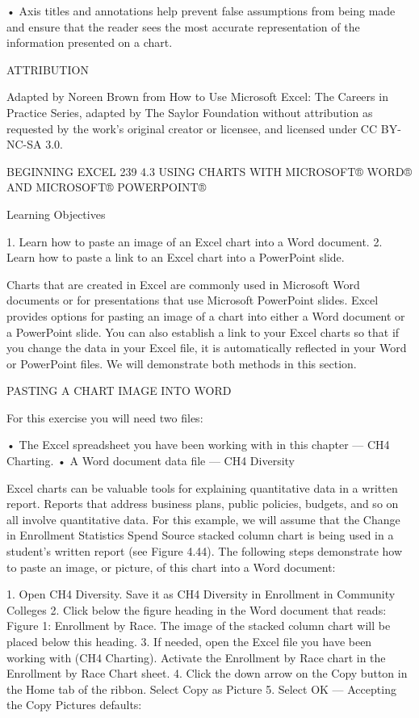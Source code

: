 • Axis titles and annotations help prevent false assumptions from being made and ensure that the reader sees
the most accurate representation of the information presented on a chart.



ATTRIBUTION

Adapted by Noreen Brown from How to Use Microsoft Excel: The Careers in Practice Series, adapted
by The Saylor Foundation without attribution as requested by the work’s original creator or
licensee, and licensed under CC BY-NC-SA 3.0.




BEGINNING EXCEL 239
4.3 USING CHARTS WITH MICROSOFT® WORD® AND MICROSOFT®
POWERPOINT®




Learning Objectives


1. Learn how to paste an image of an Excel chart into a Word document.
2. Learn how to paste a link to an Excel chart into a PowerPoint slide.



Charts that are created in Excel are commonly used in Microsoft Word documents or for
presentations that use Microsoft PowerPoint slides. Excel provides options for pasting an image of a
chart into either a Word document or a PowerPoint slide. You can also establish a link to your Excel
charts so that if you change the data in your Excel file, it is automatically reflected in your Word or
PowerPoint files. We will demonstrate both methods in this section.

PASTING A CHART IMAGE INTO WORD

For this exercise you will need two files:

• The Excel spreadsheet you have been working with in this chapter — CH4 Charting.
• A Word document data file — CH4 Diversity

Excel charts can be valuable tools for explaining quantitative data in a written report. Reports that
address business plans, public policies, budgets, and so on all involve quantitative data. For this
example, we will assume that the Change in Enrollment Statistics Spend Source stacked column chart
is being used in a student’s written report (see Figure 4.44). The following steps demonstrate how to
paste an image, or picture, of this chart into a Word document:

1. Open CH4 Diversity. Save it as CH4 Diversity in Enrollment in Community Colleges
2. Click below the figure heading in the Word document that reads: Figure 1: Enrollment by
Race. The image of the stacked column chart will be placed below this heading.
3. If needed, open the Excel file you have been working with (CH4 Charting). Activate the
Enrollment by Race chart in the Enrollment by Race Chart sheet.
4. Click the down arrow on the Copy button in the Home tab of the ribbon. Select Copy as
Picture
5. Select OK — Accepting the Copy Pictures defaults:

